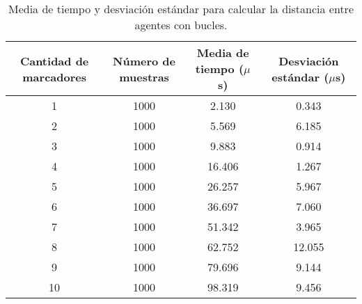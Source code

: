 \begin{table}[H]
	\centering
	\resizebox{\textwidth}{!} {
	\begin{tabular}{|c|c|c|c|}
		\hline
		\textbf{Cantidad de marcadores} & \textbf{Número de muestras} & \textbf{Media de tiempo ($\mu$s)} & \textbf{Desviación estándar ($\mu$s)} \\ \hline
		1                               & 1000                        & 2.130                         & 0.343                             \\ \hline
		2                               & 1000                        & 5.569                         & 6.185                             \\ \hline
		3                               & 1000                        & 9.883                         & 0.914                             \\ \hline
		4                               & 1000                        & 16.406                        & 1.267                             \\ \hline
		5                               & 1000                        & 26.257                        & 5.967                             \\ \hline
		6                               & 1000                        & 36.697                        & 7.060                             \\ \hline
		7                               & 1000                        & 51.342                        & 3.965                             \\ \hline
		8                               & 1000                        & 62.752                        & 12.055                            \\ \hline
		9                               & 1000                        & 79.696                        & 9.144                             \\ \hline
		10                              & 1000                        & 98.319                        & 9.456                             \\ \hline
	\end{tabular}}
	\caption{Media de tiempo y desviación estándar para calcular la distancia entre agentes con bucles.}
	\label{cuadro:tiempos_distancias_for}
\end{table}

